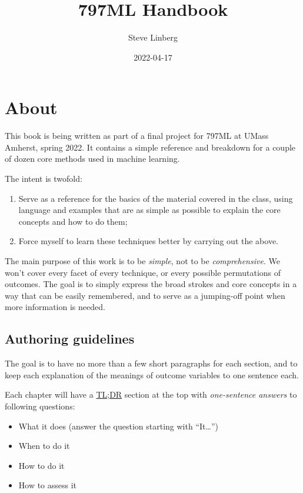 \documentclass[
]{book}
\title{797ML Handbook}
\author{Steve Linberg}
\date{2022-04-17}
\providecommand{\tightlist}{%
  \setlength{\itemsep}{0pt}\setlength{\parskip}{0pt}}
\begin{document}
\maketitle

{
\setcounter{tocdepth}{1}
\tableofcontents
}
\hypertarget{about}{%
\chapter{About}\label{about}}

This book is being written as part of a final project for 797ML at UMass
Amherst, spring 2022. It contains a simple reference and breakdown for a
couple of dozen core methods used in machine learning.

The intent is twofold:

\begin{enumerate}
\def\labelenumi{\arabic{enumi}.}
\tightlist
\item
  Serve as a reference for the basics of the material covered in the class, using language and examples that are as simple as possible to explain the core concepts and how to do them;
\item
  Force myself to learn these techniques better by carrying out the above.
\end{enumerate}

The main purpose of this work is to be \emph{simple}, not to be \emph{comprehensive}. We won't cover every facet of every technique, or every possible permutations of outcomes. The goal is to simply express the broad strokes and core concepts in a way that can be easily remembered, and to serve as a jumping-off point when more information is needed.

\hypertarget{authoring-guidelines}{%
\section{Authoring guidelines}\label{authoring-guidelines}}

The goal is to have no more than a few short paragraphs for each section, and to keep each explanation of the meanings of outcome variables to one sentence each.

Each chapter will have a \href{https://en.wikipedia.org/wiki/Wikipedia:Too_long;_didn\%27t_read}{TL;DR} section at the top with \emph{one-sentence answers} to following questions:

\begin{itemize}
\tightlist
\item
  What it does (answer the question starting with ``It\ldots{}'')
\item
  When to do it
\item
  How to do it
\item
  How to assess it
\end{itemize}
\end{document}
